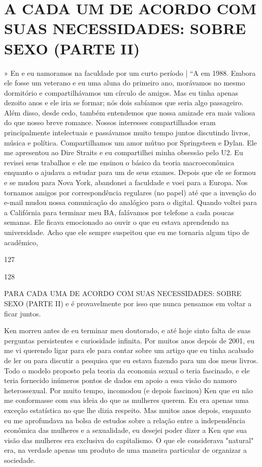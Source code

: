 \chapter{A CADA UM DE ACORDO COM SUAS NECESSIDADES: SOBRE SEXO (PARTE II)}\label{A CADA UM DE ACORDO COM SUAS NECESSIDADES: SOBRE SEXO (PARTE II)}
 \par 
» En e eu namoramos na faculdade por um curto período | “A em 1988. Embora ele fosse um veterano e eu uma aluna do primeiro ano, morávamos no mesmo dormitório e compartilhávamos um círculo de amigos. Mas eu tinha apenas dezoito anos e ele iria se formar; nós dois sabíamos que seria algo passageiro. Além disso, desde cedo, também entendemos que nossa amizade era mais valiosa do que nosso breve romance. Nossos interesses compartilhados eram principalmente intelectuais e passávamos muito tempo juntos discutindo livros, música e política. Compartilhamos um amor mútuo por Springsteen e Dylan. Ele me apresentou ao Dire Straits e eu compartilhei minha obsessão pelo U2. Eu revisei seus trabalhos e ele me ensinou o básico da teoria macroeconômica enquanto o ajudava a estudar para um de seus exames. Depois que ele se formou e se mudou para Nova York, abandonei a faculdade e voei para a Europa. Nos tornamos amigos por correspondência regulares (no papel) até que a invenção do e-mail mudou nossa comunicação do analógico para o digital. Quando voltei para a Califórnia para terminar meu BA, falávamos por telefone a cada poucas semanas. Ele ficava emocionado ao ouvir o que eu estava aprendendo na universidade. Acho que ele sempre suspeitou que eu me tornaria algum tipo de acadêmico,
 \par 
127
 \par 
128
 \par 
PARA CADA UMA DE ACORDO COM SUAS NECESSIDADES: SOBRE SEXO (PARTE II) e é provavelmente por isso que nunca pensamos em voltar a ficar juntos.
 \par 
Ken morreu antes de eu terminar meu doutorado, e até hoje sinto falta de suas perguntas persistentes e curiosidade infinita. Por muitos anos depois de 2001, eu me vi querendo ligar para ele para contar sobre um artigo que eu tinha acabado de ler ou para discutir a pesquisa que eu estava fazendo para um dos meus livros. Todo o modelo proposto pela teoria da economia sexual o teria fascinado, e ele teria fornecido inúmeros pontos de dados em apoio a essa visão do namoro heterossexual. Por muito tempo, incomodou (e depois fascinou) Ken que eu não me conformasse com sua ideia do que as mulheres querem. Eu era apenas uma exceção estatística no que lhe dizia respeito. Mas muitos anos depois, enquanto eu me aprofundava na bolsa de estudos sobre a relação entre a independência econômica das mulheres e a sexualidade, eu desejei poder dizer a Ken que sua visão das mulheres era exclusiva do capitalismo. O que ele considerava "natural" era, na verdade apenas um produto de uma maneira particular de organizar a sociedade.
